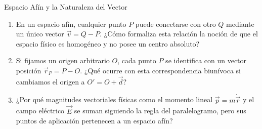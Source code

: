 \documentclass[10pt,aspectratio=169]{beamer}
\begin{document}
\begin{frame}{Espacio Afín y la Naturaleza del Vector}
  \vspace{0.2cm}
  \small
  \begin{enumerate}\itemsep14pt
    \item En un espacio afín, cualquier punto $P$ puede conectarse con otro $Q$ mediante un único vector $\vec{v} = Q - P$. ¿Cómo formaliza esta relación la noción de que el espacio físico es homogéneo y no posee un centro absoluto?
    \item Si fijamos un origen arbitrario $O$, cada punto $P$ se identifica con un vector posición $\vec{r}_P = P - O$. ¿Qué ocurre con esta correspondencia biunívoca si cambiamos el origen a $O' = O + \vec{d}$?
    \item ¿Por qué magnitudes vectoriales físicas como el momento lineal $\vec{p} = m\dot{\vec{r}}$ y el campo eléctrico $\vec{E}$ se suman siguiendo la regla del paralelogramo, pero sus puntos de aplicación pertenecen a un espacio afín?
  \end{enumerate}
\end{frame}
\end{document}
